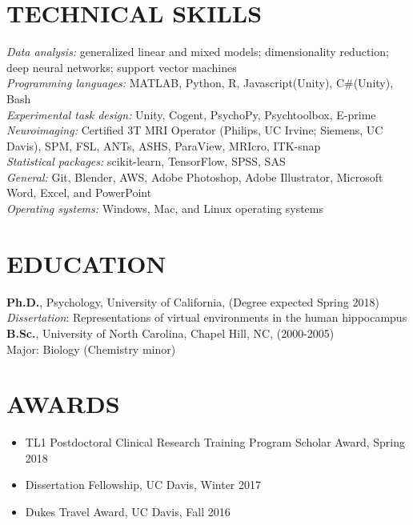 \documentclass[line,margin,10pt]{res}
\begin{document}
\begin{resume}
\section{TECHNICAL SKILLS} 
\emph{Data analysis:} generalized linear and mixed models; dimensionality reduction; deep neural networks; support vector machines\\
\emph{Programming languages:} MATLAB, Python, R, Javascript(Unity), C\#(Unity), Bash\\
\emph{Experimental task design:} Unity, Cogent, PsychoPy, Psychtoolbox, E-prime  \\
\emph{Neuroimaging:} Certified 3T MRI Operator (Philips, UC Irvine; Siemens, UC Davis), SPM, FSL, ANTs, ASHS, ParaView,  MRIcro, ITK-snap \\
\emph{Statistical packages:} scikit-learn, TensorFlow, SPSS, SAS\\
\emph{General:} Git, Blender, AWS, Adobe Photoshop, Adobe Illustrator, Microsoft Word, Excel, and PowerPoint\\
\emph{Operating systems:} Windows, Mac, and Linux operating systems\\



\section{EDUCATION} 
\textbf{Ph.D.}, Psychology, University of California, (Degree expected Spring 2018)\\
\emph{Dissertation}: Representations of virtual environments in the human hippocampus\\
\textbf{B.Sc.}, University of North Carolina, Chapel Hill, NC, (2000-2005)\\
Major: Biology (Chemistry minor)\\
				
\section{AWARDS}
\begin{itemize} \itemsep -2pt
\item TL1 Postdoctoral Clinical Research Training Program Scholar Award, Spring 2018
\item Dissertation Fellowship, UC Davis, Winter 2017
\item	Dukes Travel Award, UC Davis, Fall 2016
\end{itemize}


\end{resume}
\end{document}
